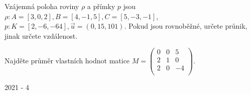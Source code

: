 \begin{questions}
\newpage
\question Vzájemná poloha roviny \(\rho\) a přímky \(p\) jsou \(\rho: A=[3,0,2], B=[4,-1,5], C=[5,-3,-1]\), \(p: K=[2,-6,-64], \overrightarrow{u}=(0,15,101)\). Pokud jsou rovnoběžné, určete průnik, jinak určete vzdálenost.

\question Najděte průměr vlastních hodnot matice \(M=\begin{pmatrix}
    0 & 0 & 5\\
    2 & 1 & 0\\
    2 & 0 & -4\\
\end{pmatrix}\).
\end{questions}



\newpage
{\large 2021 - 4}

